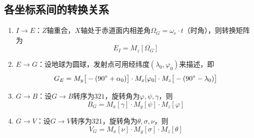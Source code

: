 \subsection{各坐标系间的转换关系}
\begin{enumerate}
	\item $I \to E$：$Z$轴重合，$X$轴处于赤道面内相差角$\varOmega_G = \omega_e \cdot t$（时角），则转换矩阵为
	\begin{equation}
		E_I = M_z [\varOmega_G]
	\end{equation}
	
	\item $E \to G$：设地球为圆球，发射点可用经纬度$(\lambda_0, \varphi_0)$来描述，即
	\begin{equation}
		G_E = M_y\big[-(90{}^{\circ} + \alpha_0)\big]\cdot M_x[\varphi_0] \cdot M_z \big[-(90 {}^{\circ} - \lambda_0)\big]
	\end{equation}

	\item $G \to B$：设$G \to B$转序为$321$，旋转角为$\varphi, \psi ,\gamma$，则
	\begin{equation}
		B_G = M_x[\gamma]\cdot M_y[\psi] \cdot M_z[\varphi]
	\end{equation}
	\hspace*{1em}

	\item $G \to V$：设$G \to V$转序为$321$，旋转角为$\theta, \sigma ,\nu$，则
	\begin{equation}
		V_G = M_x[\nu]\cdot M_y[\sigma] \cdot M_z[\theta]
	\end{equation}
	\hspace*{1em}


\end{enumerate}
